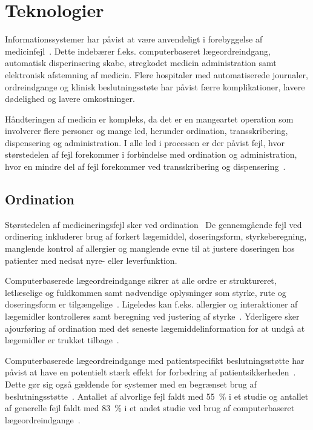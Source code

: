 \chapter{Teknologier}
Informationssystemer har påvist at være anvendeligt i forebyggelse af medicinfejl~\citep{Agrawal2009, Anderson2002}. Dette indebærer f.eks. computerbaseret lægeordreindgang, automatisk disperinsering skabe, stregkodet medicin administration samt elektronisk afstemning af medicin. Flere hospitaler med automatiserede journaler, ordreindgange og klinisk beslutningsstøte har påvist færre komplikationer, lavere dødelighed og lavere omkostninger.  

Håndteringen af medicin er kompleks, da det er en mangeartet operation som involverer flere personer og mange led, herunder ordination, transskribering, dispensering og administration. I alle led i processen er der påvist fejl, hvor størstedelen af fejl forekommer i forbindelse med ordination og administration, hvor en mindre del af fejl forekommer ved transskribering og dispensering~\citep{Agrawal2009,Anderson2002}.

\section{Ordination}
Størstedelen af medicineringsfejl sker ved ordination~\citep{Agrawal2009,Anderson2002,Kaushal2002}
De gennemgående fejl ved ordinering inkluderer brug af forkert lægemiddel, doseringsform, styrkeberegning, manglende kontrol af allergier og manglende evne til at justere doseringen hos patienter med nedsat nyre- eller leverfunktion.~\citep{Agrawal2009} 

Computerbaserede lægeordreindgange sikrer at alle ordre er struktureret, letlæselige og fuldkommen samt nødvendige oplysninger som styrke, rute og doseringsform er tilgængelige~\citep{Agrawal2009,Bates2000a}. Ligeledes kan f.eks. allergier og interaktioner af lægemidler kontrolleres samt beregning ved justering af styrke~\citep{Agrawal2009}. Yderligere sker ajourføring af ordination med det seneste lægemiddelinformation for at undgå at lægemidler er trukket tilbage~\citep{Agrawal2009}.

Computerbaserede lægeordreindgange med patientspecifikt beslutningsstøtte har påvist at have en potentielt stærk effekt for forbedring af patientsikkerheden~\citep{Agrawal2009, Bates2000a}. Dette gør sig også gældende for systemer med en begrænset brug af beslutningsstøtte~\citep{Bates2000a}. Antallet af alvorlige fejl faldt med 55~\% i et studie og antallet af generelle fejl faldt med 83~\% i et andet studie ved brug af computerbaseret lægeordreindgange~\citep{Bates2000a}. 

